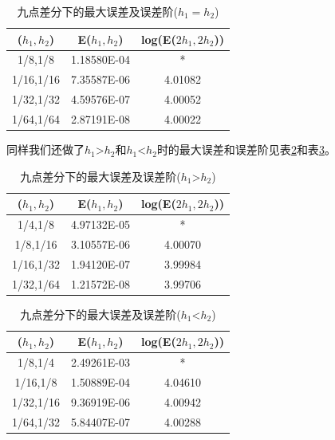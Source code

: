 \documentclass[withoutpreface,bwprint]{cumcmthesis} %
\begin{document}
\begin{table}[htbp]
	\centering
	\caption{九点差分下的最大误差及误差阶($h_1=h_2$)}
	\begin{tabular}{ccc}
		\toprule[1.5pt]
		($h_1,h_2$) & E($h_1,h_2$) & log(E($2h_1,2h_2$)) \\
		\midrule[1pt]
		1/8,1/8 & 1.18580E-04 & * \\
		1/16,1/16 & 7.35587E-06 & 4.01082  \\
		1/32,1/32 & 4.59576E-07 & 4.00052  \\
		1/64,1/64 & 2.87191E-08 & 4.00022  \\
		\bottomrule[1.5pt]
	\end{tabular}%
	\label{tab:4}%
\end{table}%

同样我们还做了$h_1$>$h_2$和$h_1$<$h_2$时的最大误差和误差阶见表\ref{tab:5}和表\ref{tab:6}。
\begin{table}[htbp]
	\centering
	\caption{九点差分下的最大误差及误差阶($h_1$>$h_2$)}
	\begin{tabular}{ccc}
		\toprule[1.5pt]
		($h_1,h_2$) & E($h_1,h_2$) & log(E($2h_1,2h_2$)) \\
		\midrule[1pt]
		1/4,1/8 & 4.97132E-05 & * \\
		1/8,1/16 & 3.10557E-06 & 4.00070  \\
		1/16,1/32 & 1.94120E-07 & 3.99984  \\
		1/32,1/64 & 1.21572E-08 & 3.99706  \\
		\bottomrule[1.5pt]
	\end{tabular}%
	\label{tab:5}%
\end{table}%

\begin{table}[htbp]
	\centering
	\caption{九点差分下的最大误差及误差阶($h_1$<$h_2$)}
	\begin{tabular}{ccc}
		\toprule[1.5pt]
		($h_1,h_2$) & E($h_1,h_2$) & log(E($2h_1,2h_2$)) \\
		\midrule[1pt]
		1/8,1/4 & 2.49261E-03 & * \\
		1/16,1/8 & 1.50889E-04 & 4.04610  \\
		1/32,1/16 & 9.36919E-06 & 4.00942  \\
		1/64,1/32 & 5.84407E-07 & 4.00288  \\
		\bottomrule[1.5pt]
	\end{tabular}%
	\label{tab:6}%
\end{table}%
\end{document}
